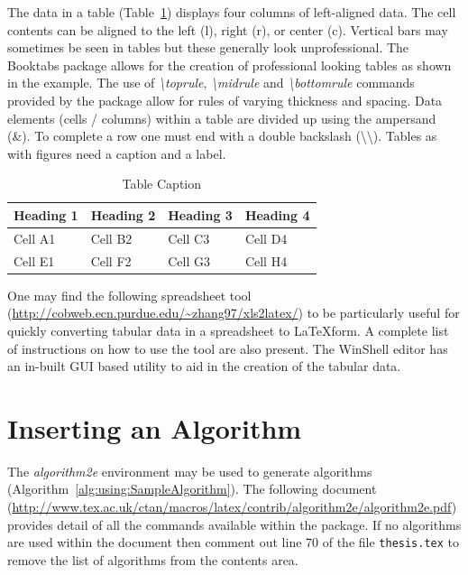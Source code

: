 The data in a table (Table~\ref{tab:using:TableExample}) displays four columns of left-aligned data. The cell contents can be aligned to the left (l), right (r), or center (c). Vertical bars may sometimes be seen in tables but these generally look unprofessional. The Booktabs package \cite{web:Fear2005BookTabs} allows for the creation of professional looking tables as shown in the example.  The use of \emph{\textbackslash toprule}, \emph{\textbackslash midrule} and \emph{\textbackslash bottomrule} commands provided by the package allow for rules of varying thickness and spacing. Data elements (cells / columns) within a table are divided up using the ampersand (\&). To complete a row one must end with a double backslash (\textbackslash\textbackslash). Tables as with figures need a caption and a label.

\begin{table}[H]
\centering
\small
\begin{tabular}{llll}
\toprule \textbf{Heading 1}& \textbf{Heading 2}&\textbf{Heading 3}&\textbf{Heading 4}\\
\midrule
Cell A1 & Cell B2 & Cell C3 & Cell D4\\
Cell E1 & Cell F2 & Cell G3 & Cell H4\\
\bottomrule
\end{tabular}
\caption{Table Caption}\label{tab:using:TableExample}
\end{table}



One may find the following spreadsheet tool (\url{http://cobweb.ecn.purdue.edu/~zhang97/xls2latex/}) to be particularly useful for quickly converting tabular data in a spreadsheet to \LaTeX \space form. A complete list of instructions on how to use the tool are also present. The WinShell editor has an in-built GUI based utility to aid in the creation of the tabular data.

\section{Inserting an Algorithm}

The \emph{algorithm2e} environment may be used to generate algorithms (Algorithm~\ref{alg:using:SampleAlgorithm}). The following document (\url{http://www.tex.ac.uk/ctan/macros/latex/contrib/algorithm2e/algorithm2e.pdf}) provides detail of all the commands available within the package. If no algorithms are used within the document then comment out line 70 of the file {\tt thesis.tex} to remove the list of algorithms from the contents area.

